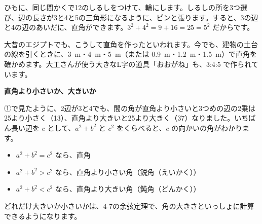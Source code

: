 ひもに、同じ間かくで12のしるしをつけて、輪にします。しるしの所を3つ選び、辺の長さが3と4と5の三角形になるように、ピンと張ります。すると、3の辺と4の辺のあいだに、直角ができます。$3^2+4^2=9+16=25=5^2$ だからです。

\noindent\begin{minipage}[c]{0.4\linewidth}\centering
{}
\end{minipage}\hfill
\begin{minipage}[c]{0.56\linewidth}
大昔のエジプトでも、こうして直角を作ったといわれます。今でも、建物の土台の線を引くときに、\qty{3}{m}・\qty{4}{m}・\qty{5}{m}（または \qty{0.9}{m}・\qty{1.2}{m}・\qty{1.5}{m}）で直角を確かめます。大工さんが使う大きなL字の道具「おおがね」も、3:4:5 で作られています。
\end{minipage}

\begin{motto}[3]
\textbf{直角より小さいか、大きいか}\par
①で見たように、2辺が3と4でも、間の角が直角より小さいと3つめの辺の2乗は25より小さく（13）、直角より大きいと25より大きく（37）なりました。いちばん長い辺を $c$ として、$a^2+b^2$ と $c^2$ をくらべると、$c$ の向かいの角がわかります。
\begin{itemize}[leftmargin=1.2\zw, itemsep=0pt, topsep=2pt, label={\color{bkGray}●}]
\item $a^2+b^2=c^2$ なら、直角
\item $a^2+b^2>c^2$ なら、直角より小さい角（鋭角（えいかく））
\item $a^2+b^2<c^2$ なら、直角より大きい角（鈍角（どんかく））
\end{itemize}
どれだけ大きいか小さいかは、4-7の余弦定理で、角の大きさといっしょに計算できるようになります。
\end{motto}

